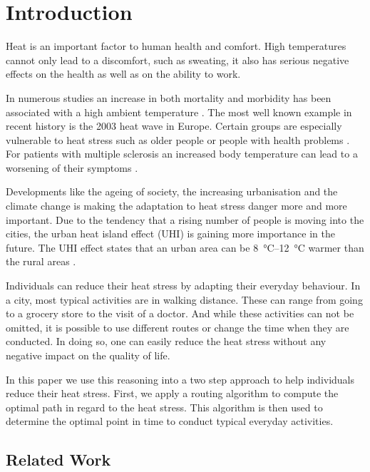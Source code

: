 
\section{Introduction}

Heat is an important factor to human health and comfort. High temperatures cannot only lead to a discomfort, such as sweating, it also has serious negative effects on the health as well as on the ability to work. 

In numerous studies an increase in both mortality and
morbidity has been associated with a high ambient temperature \parencite{Basu2009}. The most well known example in recent history is the 2003 heat wave in Europe. 
Certain groups are especially vulnerable to heat stress such as older people or people with health problems \parencite{Ebi2004,Huebler2007}. For patients with multiple sclerosis an increased body temperature can lead to a worsening of their symptoms \parencite{Davis2010}.

Developments like the ageing of society, the increasing urbanisation and the climate change is making the adaptation to heat stress danger more and more important. Due to the tendency that a rising number of people is moving into the cities, the urban heat island effect (UHI) is gaining more importance in the future. The UHI effect states that an urban area can be  \SIrange{8}{12}{\celsius} warmer than the rural areas \parencite{Prashad2014}. 

Individuals can reduce their heat stress by adapting their everyday behaviour. In a city, most typical activities are in walking distance. These can range from going to a grocery store to the visit of a doctor. And while these activities can not be omitted, it is possible to use different routes or change the time when they are conducted. In doing so, one can easily reduce the heat stress without any negative impact on the quality of life. 

In this paper we use this reasoning into a two step approach to help individuals reduce their heat stress. First, we apply a routing algorithm to compute the optimal path in regard to the heat stress. This algorithm is then used to determine the optimal point in time to conduct typical everyday activities. 
  
\subsection{Related Work} 

